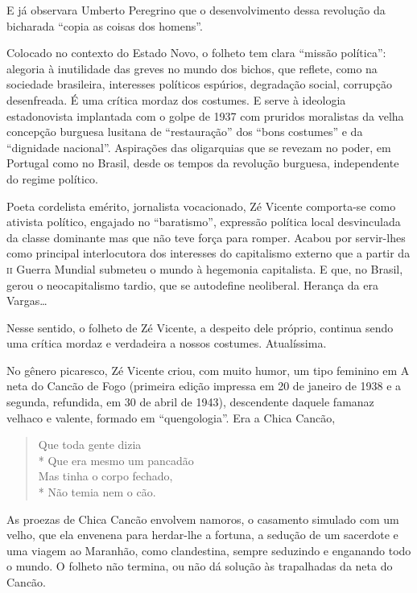 E já observara Umberto Peregrino que o desenvolvimento dessa revolução
da bicharada “copia as coisas dos homens”. 

Colocado no contexto do Estado Novo, o folheto tem clara “missão
política”: alegoria à inutilidade das greves no mundo dos bichos, que
reflete, como na sociedade brasileira, interesses políticos espúrios,
degradação social, corrupção desenfreada. É uma crítica mordaz dos
costumes. E serve à ideologia estadonovista implantada com o golpe de
1937 com pruridos moralistas da velha concepção burguesa lusitana de
“restauração” dos “bons costumes” e da “dignidade nacional”.
Aspirações das oligarquias que se revezam no poder, em Portugal como
no Brasil, desde os tempos da revolução burguesa, independente do
regime político.

Poeta cordelista emérito, jornalista vocacionado, Zé Vicente
comporta-se como ativista político, engajado no “baratismo”,
expressão política local desvinculada da classe dominante mas que não
teve força para romper. Acabou por servir-lhes como principal
interlocutora dos interesses do capitalismo externo que a partir da
\textsc{ii} Guerra Mundial submeteu o mundo à hegemonia capitalista. E que, no
Brasil, gerou o neocapitalismo tardio, que se autodefine neoliberal.
Herança da era Vargas\ldots{}

Nesse sentido, o folheto de Zé Vicente, a despeito dele próprio,
continua sendo uma crítica mordaz e verdadeira a nossos costumes.
Atualíssima.

No gênero picaresco, Zé Vicente criou, com muito humor, um tipo
feminino em A neta do Cancão de Fogo (primeira edição impressa em 20
de janeiro de 1938 e a segunda, refundida, em 30 de abril de 1943),
descendente daquele famanaz velhaco e valente, formado em
“quengologia”. Era a Chica Cancão,

\begin{verse}
Que toda gente dizia\\*
Que era mesmo um pancadão\\
Mas tinha o corpo fechado, \\*
Não temia nem o cão.
\end{verse}

As proezas de Chica Cancão envolvem namoros, o casamento simulado com
um velho, que ela envenena para herdar-lhe a fortuna, a sedução de um
sacerdote e uma viagem ao Maranhão, como clandestina, sempre
seduzindo e enganando todo o mundo. O folheto não termina, ou não dá
solução às trapalhadas da neta do Cancão.

